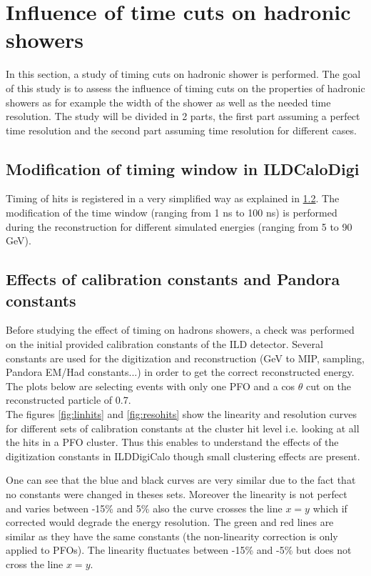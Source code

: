 \section{Influence of time cuts on hadronic showers}

In this section, a study of timing cuts on hadronic shower is performed. The goal of this study is to assess the influence of timing cuts on the properties of hadronic showers as for example the width of the shower as well as the needed time resolution. The study will be divided in 2 parts, the first part assuming a perfect time resolution and the second part assuming time resolution for different cases.

\subsection{Modification of timing window in ILDCaloDigi}

Timing of hits is registered in a very simplified way as explained in \ref{}. The modification of the time window (ranging from 1 ns to 100 ns) is performed during the reconstruction for different simulated \kzeroL energies (ranging from 5 to 90 GeV).

\subsection{Effects of calibration constants and Pandora constants}

Before studying the effect of timing on hadrons showers, a check was performed on the initial provided calibration constants of the ILD detector. Several constants are used for the digitization and reconstruction (GeV to MIP, sampling, Pandora EM/Had constants...) in order to get the correct reconstructed energy. The plots below are selecting events with only one PFO and a cos $\theta$ cut on the reconstructed particle of 0.7.\\

The figures \ref{fig:linhits} and \ref{fig:resohits} show the linearity and resolution curves for different sets of calibration constants at the cluster hit level i.e. looking at all the hits in a PFO cluster. Thus this enables to understand the effects of the digitization constants in ILDDigiCalo though small clustering effects are present.

One can see that the blue and black curves are very similar due to the fact that no constants were changed in theses sets. Moreover the linearity is not perfect and varies between -15\% and 5\% also the curve crosses the line $x=y$ which if corrected would degrade the energy resolution. The green and red lines are similar as they have the same constants (the non-linearity correction is only applied to PFOs). The linearity fluctuates between -15\% and -5\% but does not cross the line $x=y$.

